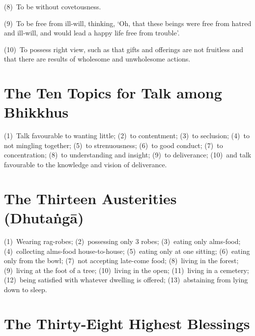 (8)~To be without covetousness.

(9)~To be free from ill-will, thinking, ‘Oh, that these beings were free from hatred
and ill-will, and would lead a happy life free from trouble’.

(10)~To possess right view, such as that gifts and offerings are not fruitless and
that there are results of wholesome and unwholesome actions.


\ifhandbookedition
\vspace*{-\baselineskip}
\fi

\section*{The Ten Topics for Talk among Bhikkhus}

(1)~Talk favourable to wanting little;
(2)~to contentment;
(3)~to seclusion;
(4)~to not mingling together;
(5)~to strenuousness;
(6)~to good conduct;
(7)~to concentration;
(8)~to understanding and insight;
(9)~to deliverance;
(10)~and talk favourable to the knowledge and vision of deliverance.


\ifhandbookedition
\vspace*{-\baselineskip}
\fi

\section*{The Thirteen Austerities (Dhutaṅgā)}

(1)~Wearing rag-robes;
(2)~possessing only 3 robes;
(3)~eating only alms-food;
(4)~collecting alms-food house-to-house;
(5)~eating only at one sitting;
(6)~eating only from the bowl;
(7)~not accepting late-come food;
(8)~living in the forest;
(9)~living at the foot of a tree;
(10)~living in the open;
(11)~living in a cemetery;
(12)~being satisfied with whatever dwelling is offered;
(13)~abstaining from lying down to sleep.


\ifhandbookedition
\clearpage
\fi

\section*{The Thirty-Eight Highest Blessings}

